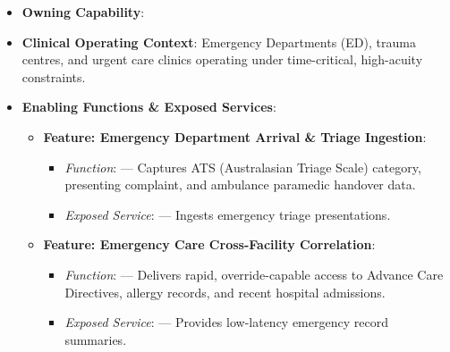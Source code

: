 \begin{itemize}

\item
\textbf{Owning Capability}: \texttt{}



\item
\textbf{Clinical Operating Context}: Emergency Departments (ED), trauma centres, and urgent care clinics operating under time-critical, high-acuity constraints.



\item
\textbf{Enabling Functions \& Exposed Services}:


\begin{itemize}

\item
\textbf{Feature: Emergency Department Arrival \& Triage Ingestion}:


\begin{itemize}

\item
\emph{Function}: \texttt{} — Captures ATS (Australasian Triage Scale) category, presenting complaint, and ambulance paramedic handover data.



\item
\emph{Exposed Service}: \texttt{} — Ingests emergency triage presentations.



\end{itemize}


\item
\textbf{Feature: Emergency Care Cross-Facility Correlation}:


\begin{itemize}

\item
\emph{Function}: \texttt{} — Delivers rapid, override-capable access to Advance Care Directives, allergy records, and recent hospital admissions.



\item
\emph{Exposed Service}: \texttt{} — Provides low-latency emergency record summaries.



\end{itemize}



\end{itemize}
\end{itemize}
